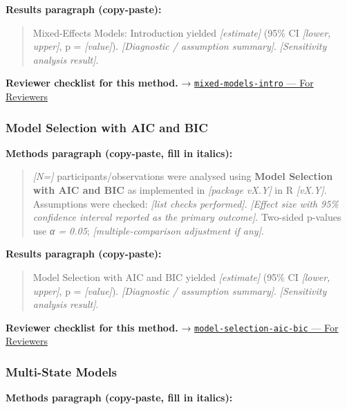 \documentclass[
]{article}
\begin{document}
\textbf{Results paragraph (copy-paste):}

\begin{quote}
Mixed-Effects Models: Introduction yielded \emph{{[}estimate{]}} (95\%
CI \emph{{[}lower, upper{]}}, p = \emph{{[}value{]}}).
\emph{{[}Diagnostic / assumption summary{]}}. \emph{{[}Sensitivity
analysis result{]}}.
\end{quote}

\textbf{Reviewer checklist for this method.} →
\href{../chapters/07-regression/mixed-models-intro.Rmd\#for-reviewers}{\texttt{mixed-models-intro}
--- For Reviewers}

\subsubsection{Model Selection with AIC and
BIC}\label{model-selection-with-aic-and-bic}

\textbf{Methods paragraph (copy-paste, fill in italics):}

\begin{quote}
\emph{{[}N={]}} participants/observations were analysed using
\textbf{Model Selection with AIC and BIC} as implemented in
\emph{{[}package vX.Y{]}} in R \emph{{[}vX.Y{]}}. Assumptions were
checked: \emph{{[}list checks performed{]}}. \emph{{[}Effect size with
95\% confidence interval reported as the primary outcome{]}}. Two-sided
p-values use \emph{α = 0.05}; \emph{{[}multiple-comparison adjustment if
any{]}}.
\end{quote}

\textbf{Results paragraph (copy-paste):}

\begin{quote}
Model Selection with AIC and BIC yielded \emph{{[}estimate{]}} (95\% CI
\emph{{[}lower, upper{]}}, p = \emph{{[}value{]}}). \emph{{[}Diagnostic
/ assumption summary{]}}. \emph{{[}Sensitivity analysis result{]}}.
\end{quote}

\textbf{Reviewer checklist for this method.} →
\href{../chapters/07-regression/model-selection-aic-bic.Rmd\#for-reviewers}{\texttt{model-selection-aic-bic}
--- For Reviewers}

\subsubsection{Multi-State Models}\label{multi-state-models}

\textbf{Methods paragraph (copy-paste, fill in italics):}
\end{document}
